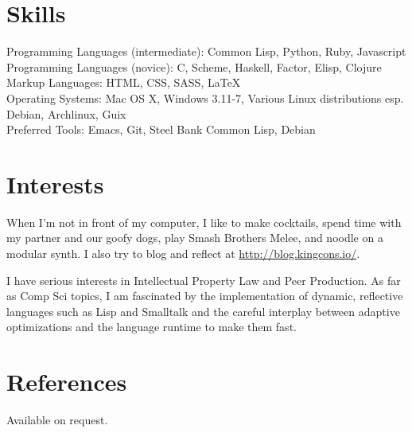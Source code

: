 \documentclass[margintitle,line]{res}
\begin{document}
\begin{resume}
\setlength{\parskip}{1ex}


\section{Skills}

Programming Languages (intermediate): Common Lisp, Python, Ruby, Javascript \\
Programming Languages (novice): C, Scheme, Haskell, Factor, Elisp, Clojure \\
Markup Languages: HTML, CSS, SASS, LaTeX \\
Operating Systems: Mac OS X, Windows 3.11-7, Various Linux distributions
esp. Debian, Archlinux, Guix \\
Preferred Tools: Emacs, Git, Steel Bank Common Lisp, Debian \\


\section{Interests}

When I'm not in front of my computer, I like to make cocktails, spend
time with my partner and our goofy dogs, play Smash Brothers Melee,
and noodle on a modular synth. I also try to blog and reflect at
\url{http://blog.kingcons.io/}.

I have serious interests in Intellectual Property Law and Peer Production.
As far as Comp Sci topics, I am fascinated by the implementation of dynamic,
reflective languages such as Lisp and Smalltalk and the careful interplay
between adaptive optimizations and the language runtime to make them fast.


\section{References}

Available on request.

\end{resume}
\end{document}
